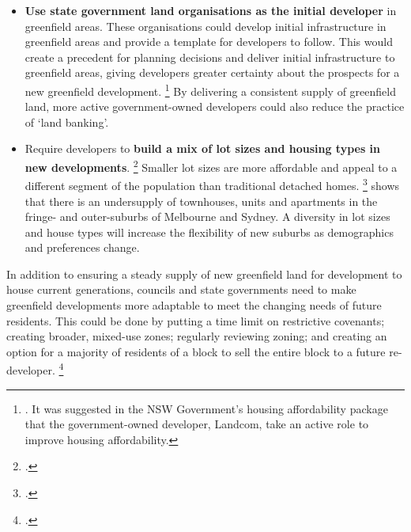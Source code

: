 \begin{itemize}
	\footnote{For example, \textcite{Terrill-Emslie-2017-Value-capture}.
	\textcites{Spiller-AndersonOliver-2015-Revisiting-economics-inclusionary-zoning}[][113]{Gurran_Bramley_2017_urban_planning_housing_market}[][10]{Terrill-Emslie-2017-Value-capture}
	note that developer charges are most likely to be borne by the landowner at the time the charge is determined by reducing the price a developer will be willing to pay for the land, particularly if the charges are known in advance.
	Yet developer charges are often poorly targeted at capturing value uplift since they are charged per property or per square metre of floor space, and tax some windfall gains but not others.}
\item
  \textbf{Use state government land organisations as the initial developer} in greenfield areas.
  These organisations could develop initial infrastructure in greenfield areas and provide a template for developers to follow.
  This would create a precedent for planning decisions and deliver initial infrastructure to greenfield areas, giving developers greater certainty about the prospects for a new greenfield development.%
	\footnote{\textcite[][137]{PC2011PerformanceBenchmark}.
    It was suggested in the NSW Government's housing affordability package that the government-owned developer, Landcom, take an active role to improve housing affordability.}
  By delivering a consistent supply of greenfield land, more active government-owned developers could also reduce the practice of `land banking'.
\item
  Require developers to \textbf{build a mix of lot sizes and housing types in new developments}.%
	\footcites{Kelly-etal-2012-Tomorrows-suburbs}{NSW-2015-Planning-Complying-date}
  Smaller lot sizes are more affordable and appeal to a different segment of the population than traditional detached homes.%
  \footcite[][129]{Treasury2013Housing}
   shows that there is an undersupply of townhouses, units and apartments in the fringe- and outer-suburbs of Melbourne and Sydney.
  A diversity in lot sizes and house types will increase the flexibility of new suburbs as demographics and preferences change.
\end{itemize}

In addition to ensuring a steady supply of new greenfield land for development to house current generations, councils and state governments need to make greenfield developments more adaptable to meet the changing needs of future residents.
This could be done by putting a time limit on restrictive covenants; creating broader, mixed-use zones; regularly reviewing zoning; and creating an option for a majority of residents of a block to sell the entire block to a future re-developer.%
	\footcite{Kelly-etal-2012-Tomorrows-suburbs}


